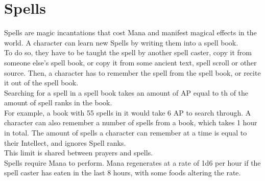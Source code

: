 \chapter*{Spells}\label{ch:spells}
Spells are magic incantations that cost Mana and manifest magical effects in the world.
A character can learn new Spells by writing them into a spell book.\\
To do so, they have to be taught the spell by another spell caster, copy it from someone else's spell book, or copy it from some ancient text, spell scroll or other source.
Then, a character has to remember the spell from the spell book, or recite it out of the spell book.\\
Searching for a spell in a spell book takes an amount of AP equal to th of the amount of spell ranks in the book.\\
For example, a book with 55 spells in it would take 6 AP to search through.
A character can also remember a number of spells from a book, which takes 1 hour in total.
The amount of spells a character can remember at a time is equal to their Intellect, and ignores Spell ranks.\\
This limit is shared between prayers and spells.\\
Spells require Mana to perform.
Mana regenerates at a rate of 1d6 per hour if the spell caster has eaten in the last 8 hours, with some foods altering the rate.\\


























